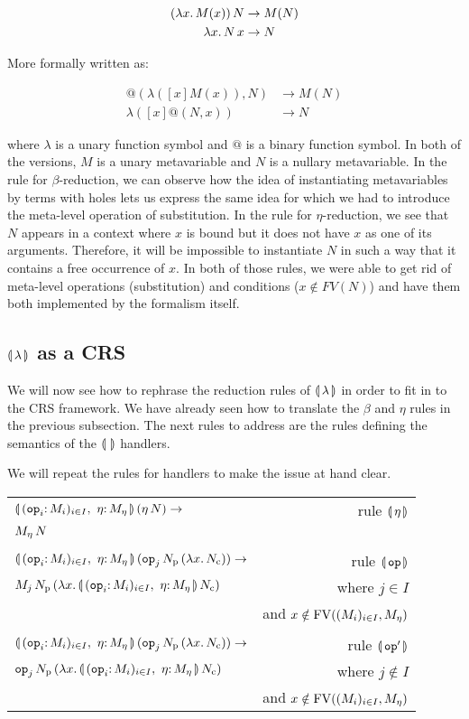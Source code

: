 \begin{align*}
  (\lambda x.\, M(x))\,N & \to M(N) \\
  \lambda x.\, N\,x & \to N
\end{align*}

More formally written as:

\begin{align*}
  @(\lambda([x]M(x)),N) & \to M(N) \\
  \lambda([x]@(N,x)) & \to N
\end{align*}

where $\lambda$ is a unary function symbol and $@$ is a binary function
symbol. In both of the versions, $M$ is a unary metavariable and $N$ is a
nullary metavariable. In the rule for $\beta$-reduction, we can observe how
the idea of instantiating metavariables by terms with holes lets us express
the same idea for which we had to introduce the meta-level operation of
substitution. In the rule for $\eta$-reduction, we see that $N$ appears in
a context where $x$ is bound but it does not have $x$ as one of its
arguments. Therefore, it will be impossible to instantiate $N$ in such a
way that it contains a free occurrence of $x$. In both of those rules, we
were able to get rid of meta-level operations (substitution) and conditions
($x \notin FV(N)$) and have them both implemented by the formalism itself.


\subsection{$\llparenthesis \, \lambda \, \rrparenthesis$ as a CRS}
\label{ssec:banana-as-crs}

We will now see how to rephrase the reduction rules of $\llparenthesis \, \lambda \, \rrparenthesis$ in
order to fit in to the CRS framework. We have already seen how to translate
the $\beta$ and $\eta$ rules in the previous subsection. The next
rules to address are the rules defining the semantics of the $\llparenthesis \,  \, \rrparenthesis$
handlers.

We will repeat the rules for handlers to make the issue at hand clear.

\begin{tabular}{lr}
  $\ap{\cibanana}{(\ap{\eta}{N})} \to$ & rule $\llparenthesis \, \eta \, \rrparenthesis$ \\
  $M_\eta\,N$ & \\
  \\
  $\ap{\cibanana}{(\ap{\ap{\op{op}_j}{N_{\mathrm{p}}}}{(\lam{x}{N_{\mathrm{c}}})})} \to$ & rule $\llparenthesis \, \mathtt{op} \, \rrparenthesis$ \\
  $\ap{M_j}{\ap{N_{\mathrm{p}}}{(\lam{x}{\ap{\cibanana}{N_{\mathrm{c}}}})}}$
  & where $j \in I$ \\
  & and $x \notin \operatorname{FV}((M_i)_{i \in I}, M_\eta)$ \\
  \\
  $\ap{\cibanana}{(\ap{\ap{\op{op}_j}{N_{\mathrm{p}}}}{(\lam{x}{N_{\mathrm{c}}})})} \to$ & rule $\llparenthesis \, \mathtt{op}' \, \rrparenthesis$ \\
  $\ap{\op{op}_j}{\ap{N_{\mathrm{p}}}{(\lam{x}{\ap{\cibanana}{N_{\mathrm{c}}}})}}$
  & where $j \notin I$ \\
  & and $x \notin \operatorname{FV}((M_i)_{i \in I}, M_\eta)$
\end{tabular}

